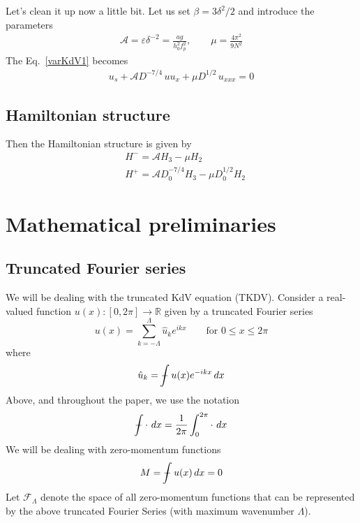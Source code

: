 \documentclass[12pt]{article}
\newcommand{\eps}{\varepsilon}
\newcommand{\uhat}{\hat{u}}
\newcommand{\RR}{\mathbb{R}}
\newcommand{\Fspace}{\mathscr{F}_{\Lambda}}
\newcommand{\ampp}{\mathcal{A}}
\newcommand{\lamfac}{N}
\def\Xint#1{\mathchoice
   {\XXint\displaystyle\textstyle{#1}}%
   {\XXint\textstyle\scriptstyle{#1}}%
   {\XXint\scriptstyle\scriptscriptstyle{#1}}%
   {\XXint\scriptscriptstyle\scriptscriptstyle{#1}}%
   \!\int}
\def\XXint#1#2#3{{\setbox0=\hbox{$#1{#2#3}{\int}$}
     \vcenter{\hbox{$#2#3$}}\kern-.5\wd0}}
\def\dashint{\Xint-}
\newcommand{\intt}{\dashint}%
\newcommand{\dx}{\, dx}
\begin{document}
Let's clean it up now a little bit. Let us set $\beta = 3 \delta^2/2$ and introduce the parameters
\begin{align}
\ampp = \eps \delta^{-2} = \frac{ag}{h_0^2 f_p^2} , \qquad
\mu = \frac{4 \pi^2}{9 \lamfac^2}
\end{align}
The Eq.~\eqref{varKdV1} becomes
\begin{align}
\label{varKdV}
u_s + \ampp D^{-7/4} \, u u_x
+ \mu D^{1/2} \, u_{xxx} = 0
\end{align}

\subsection{Hamiltonian structure}
Then the Hamiltonian structure is given by
\begin{align}
\label{Hamiltonian}
& H^- = \ampp H_3 - \mu H_2 \\
& H^+ = \ampp D_0^{-7/4} H_3 - \mu D_0^{1/2} H_2
\end{align}



\section{Mathematical preliminaries}

\subsection{Truncated Fourier series}

We will be dealing with the truncated KdV equation (TKDV). 
Consider a real-valued function $u(x): [0, 2\pi] \to \RR$ given by a truncated Fourier series
\begin{equation}
u(x) = \sum_{k= -\Lambda}^{\Lambda} \uhat_k e^{i k x}	\qquad \text{for } 0 \le x \le 2\pi
\end{equation}
where
\begin{equation}
\uhat_k = \intt u(x) e^{-i k x} \dx
\end{equation}
Above, and throughout the paper, we use the notation
\begin{equation}
\intt \cdot \, \dx  = \frac{1}{2\pi} \int_0^{2 \pi} \cdot \, \dx
\end{equation}
We will be dealing with zero-momentum functions
\begin{equation}
M = \intt u(x) \dx = 0
\end{equation}
Let $\Fspace$ denote the space of all zero-momentum functions that can be represented by the above truncated Fourier Series (with maximum wavenumber $\Lambda$).
\end{document}
